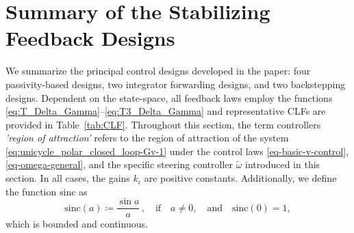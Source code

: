 \documentclass[journal,twoside,web]{ieeecolor}
\theoremstyle{definition}
\begin{document}

\section{Summary of the Stabilizing Feedback Designs}\label{sec:feedback_summary}





We summarize the principal control designs developed in the paper: four passivity-based designs,  two integrator forwarding designs, and two backstepping designs.
%
%
Dependent on the state-space, all feedback laws employ the functions \eqref{eq:T_Delta_Gamma}--\eqref{eq:T3_Delta_Gamma} and representative CLFs are provided in Table~\ref{tab:CLF}.
Throughout this section, the term controllers  \textit{'region of attraction'} refers to the region of attraction of the system \eqref{eq:unicycle_polar_closed_loop-Gv-1} under the control laws \eqref{eq-basic-v-control}, \eqref{eq-omega-general}, and the specific steering controller $\tilde{\omega}$ introduced in this section.
In all cases, the gains $k_i$ are  positive constants. Additionally, we define the function $\mbox{sinc}$ as
\begin{equation}
\mbox{sinc}(a) \coloneqq \frac{\sin a}{a}\,, \quad \text{if} \quad a \ne 0, \quad \text{and} \quad \mbox{sinc}(0) = 1,
\end{equation}
which is bounded and continuous. 
\end{document}
